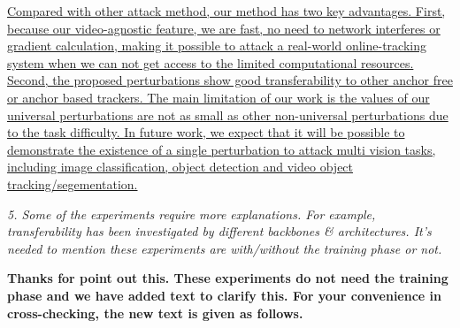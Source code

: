 \documentclass[12pt]{article}
\begin{document}
\uline{
Compared with other attack method, our method has two key advantages. First,
because our video-agnostic feature, we are fast, no need to network interferes or gradient calculation, making it possible to attack a real-world online-tracking system when we can not get access to the limited computational resources.
Second, the proposed perturbations show good transferability to other anchor free or anchor based trackers. 
The main limitation of our work is the values of our universal perturbations are not as small as other non-universal perturbations due to the task difficulty.
  In future work, we expect that it will be possible to demonstrate the existence of a single perturbation to attack multi vision tasks, including image classification, object detection and video object tracking/segementation.
}

\textit{5. Some of the experiments require more explanations. For example, transferability has been investigated by different backbones \& architectures. It's needed to mention these experiments are with/without the training phase or not.}

\textbf{Thanks for point out this. These experiments do not need the training phase and we have added text to clarify this. For your convenience in cross-checking, the new text is given as follows.}
\end{document}
